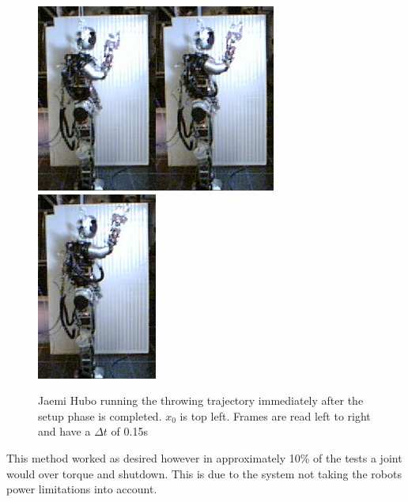 \begin{figure}[h]
\includegraphics[width=0.25\columnwidth]{./pix/slowMotion/5.png}\includegraphics[width=0.25\columnwidth]{./pix/slowMotion/6.png}\includegraphics[width=0.25\columnwidth]{./pix/slowMotion/7.png}
  \caption{Jaemi Hubo running the throwing trajectory immediately after the setup phase is completed.  $x_0$ is top left.  Frames are read left to right and have a $\Delta t$ of 0.15s\cite{dlofaro-srm}}
  \label{fig:3dThrowReal}
\end{figure}

This method worked as desired however in approximately 10\% of the tests a joint would over torque and shutdown.  This is due to the system not taking the robots power limitations into account. 

